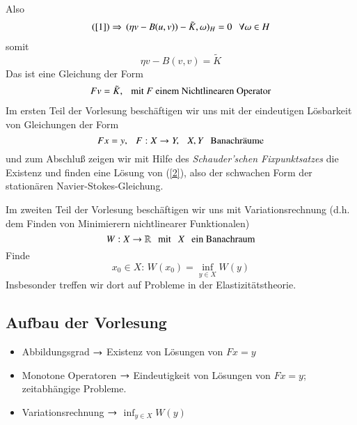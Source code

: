 Also
\begin{align*}
    (\ref{1}) \Rightarrow \, (\eta v - B(u,v)) - \tilde K , \omega)_H=0 \hspace{.25cm} \forall \omega \in H
\end{align*}
somit
\[
    \eta v - B(v,v) = \tilde K
\]
Das ist eine Gleichung der Form
\begin{align}\label{2}
    Fv=\tilde K,\hspace{.25cm}\text{mit $F$ einem Nichtlinearen Operator}
\end{align}
Im ersten Teil der Vorlesung beschäftigen wir uns mit der eindeutigen Lösbarkeit von
Gleichungen der Form
\[
    Fx=y, \hspace{.25cm} F:X\rightarrow Y, \hspace{.25cm} X,Y\hspace{.25cm} \text{Banachräume}
\]
und zum Abschluß zeigen wir mit Hilfe des \textit{Schauder'schen Fixpunktsatzes} die Existenz
und finden eine Lösung von (\ref{2}), also der schwachen Form der stationären 
Navier-Stokes-Gleichung.

Im zweiten Teil der Vorlesung beschäftigen wir uns mit Variationsrechnung (d.h. dem Finden
von Minimierern nichtlinearer Funktionalen)
\[
    W:X\rightarrow \mathbb{R} \hspace{.25cm}\text{mit} \hspace{.25cm} X \hspace{.25cm} \text{ein Banachraum}
\]
Finde 
\[
    x_0\in X: \, W(x_0)= \inf_{y\in X}W(y)
\]
Insbesonder treffen wir dort auf Probleme in der Elastizitätstheorie.

\subsection*{Aufbau der Vorlesung}
\begin{itemize}
    \item Abbildungsgrad $\rightarrow$ Existenz von Lösungen von $Fx=y$
    \item Monotone Operatoren $\rightarrow$ Eindeutigkeit von Lösungen von $Fx=y$; 
    	zeitabhängige Probleme.
    \item Variationsrechnung $\rightarrow$ $\inf_{y\in X} W(y)$
\end{itemize}
